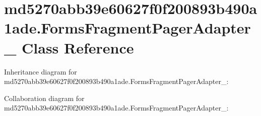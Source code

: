 \hypertarget{classmd5270abb39e60627f0f200893b490a1ade_1_1_forms_fragment_pager_adapter__1}{}\section{md5270abb39e60627f0f200893b490a1ade.\+Forms\+Fragment\+Pager\+Adapter\+\_ Class Reference}
\label{classmd5270abb39e60627f0f200893b490a1ade_1_1_forms_fragment_pager_adapter__1}


Inheritance diagram for md5270abb39e60627f0f200893b490a1ade.\+Forms\+Fragment\+Pager\+Adapter\+\_\+:


Collaboration diagram for md5270abb39e60627f0f200893b490a1ade.\+Forms\+Fragment\+Pager\+Adapter\+\_\+:
